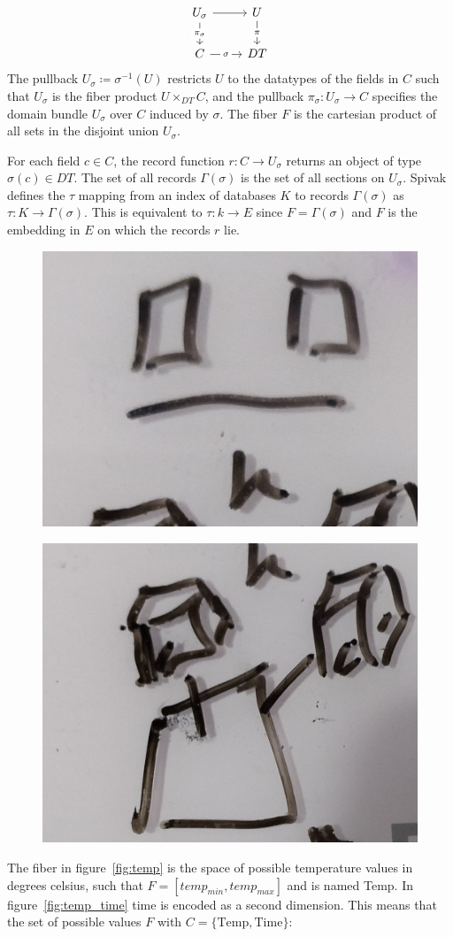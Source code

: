 \documentclass[../main.tex]{subfiles}
\begin{document}
\begin{equation}
    \begin{tikzcd}
            U_{\sigma} \arrow[d, "\pi_{\sigma}" description] \arrow[r] & U \arrow[d, "\pi" description] \\
            C \arrow[r, "\sigma" description]                          & DT                            
    \end{tikzcd}
\end{equation}
The pullback $U_{\sigma} \coloneqq \sigma^{-1}(U)$ restricts $U$ to the datatypes of the fields in $C$ such that $U_{\sigma}$ is the fiber product $U \times_{DT} C$, and the pullback $\pi_{\sigma}:U_{\sigma} \rightarrow C$ specifies the domain bundle $U_{\sigma}$ over $C$ induced by $\sigma$. The fiber $F$ is the cartesian product of all sets in the disjoint union $U_{\sigma}$. 

For each field $c \in C$, the record function $r: C \rightarrow U_{\sigma}$ returns an object of type $\sigma(c) \in DT$. The set of all records $\Gamma(\sigma)$ is the set of all sections on $U_\sigma$. Spivak defines the $\tau$ mapping from an index of databases $K$ to records $\Gamma(\sigma)$ as $\tau: K \rightarrow \Gamma(\sigma)$. This is equivalent to $\tau: k \rightarrow E$ since $F = \Gamma(\sigma)$ and $F$ is the embedding in $E$ on which the records $r$ lie.
 

\begin{figure}[ht]
    \includegraphics[width=0.2\linewidth]{figures/sections/math/temp_2f.png}
    \label{fig:}
\end{figure}
\begin{figure}[ht]
    \includegraphics[width=0.2\linewidth]{figures/sections/math/temp_3f.png}
\end{figure}


The fiber in figure~\ref{fig:temp} is the space of possible temperature values in degrees celsius, such that $F=[temp_{min}, temp_{max}]$ and is named \textrm{Temp}. In figure~\ref{fig:temp_time} \textrm{time} is encoded as a second dimension. This means that the set of possible values $F$ with $C=\{\textrm{Temp}, \textrm{Time}\}$:
\end{document}

